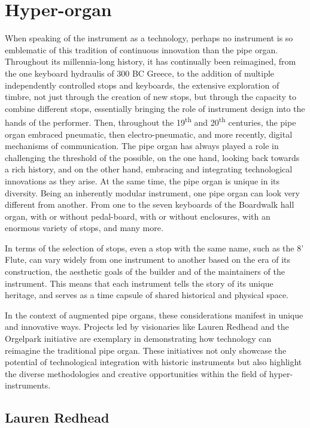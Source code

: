 \documentclass[12pt,twoside,maitrise]{dms_ks}
\theoremstyle{definition}
\begin{document}
{\section{Hyper-organ}

When speaking of the instrument as a technology, perhaps no instrument is so emblematic of this tradition of continuous innovation than the pipe organ. 
Throughout its millennia-long history, it has continually been reimagined, from the one keyboard hydraulis of 300 BC Greece, to the addition of multiple independently controlled stops and keyboards, the extensive exploration of timbre, not just through the creation of new stops, but through the capacity to combine different stops, essentially bringing the role of instrument design into the hands of the performer. 
Then, throughout the 19\textsuperscript{th} and 20\textsuperscript{th} centuries, the pipe organ embraced pneumatic, then electro-pneumatic, and more recently, digital mechanisms of communication. 
The pipe organ has always played a role in challenging the threshold of the possible, on the one hand, looking back towards a rich history, and on the other hand, embracing and integrating technological innovations as they arise. 
At the same time, the pipe organ is unique in its diversity. 
Being an inherently modular instrument, one pipe organ can look very different from another. 
From one to the seven keyboards of the Boardwalk hall organ, with or without pedal-board, with or without enclosures, with an enormous variety of stops, and many more. 

In terms of the selection of stops, even a stop with the same name, such as the 8' Flute, can vary widely from one instrument to another based on the era of its construction, the aesthetic goals of the builder and of the maintainers of the instrument. 
This means that each instrument tells the story of its unique heritage, and serves as a time capsule of shared historical and physical space.

In the context of augmented pipe organs, these considerations manifest in unique and innovative ways.
Projects led by visionaries like Lauren Redhead and the Orgelpark initiative are exemplary in demonstrating how technology can reimagine the traditional pipe organ.
These initiatives not only showcase the potential of technological integration with historic instruments but also highlight the diverse methodologies and creative opportunities within the field of hyper-instruments.

\subsection{Lauren Redhead}

}
\end{document}
